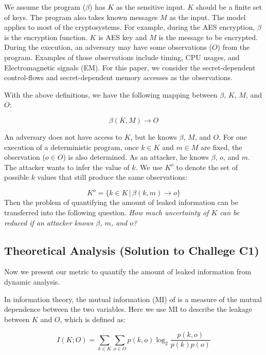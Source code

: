 We assume the program ($\beta$) has $K$ as the sensitive input. $K$ should be a
finite set of keys. The program also takes known messages $M$ as the input. The
model applies to most of the cryptosystems. For example, during the AES
encryption, $\beta$ is the encryption function. $K$ is AES key and $M$ is the
message to be encrypted. During the execution, an adversary may have some
observations ($O$) from the program. Examples of those observations include
timing, CPU usages, and Electromagnetic signals (EM). For this paper, we
consider the secret-dependent control-flows and secret-dependent memory accesses
as the observations.

With the above definitions, we have the following mapping between $\beta$, $K$,
$M$, and $O$:

\begin{displaymath}
    \beta(K, M) \rightarrow O
\end{displaymath}

An adversary does not have access to $K$, but he knows $\beta$, $M$, and $O$.
For one execution of a deterministic program, once $k \in K$ and $m \in M$ are
fixed, the observation ($o \in O$) is also determined. As an attacker, he knows
$\beta$, $o$, and $m$. The attacker wants to infer the value of $k$. We use
$K^o$ to denote the set of possible $k$ values that still produce the same
observations:

\begin{displaymath}
    K^o = \{ k \in K \, |\, \beta(k, m) \rightarrow o\}
\end{displaymath}
Then the problem of quantifying the amount of leaked information can be
transferred into the following question.
\emph{How much uncertainty of $K$ can be reduced if an attacker knows $\beta$, $m$, and $o$?}

\subsection{Theoretical Analysis \textbf{(Solution to Challege C1)}}
Now we present our metric to quantify the amount of leaked information from
dynamic analysis.

In information theory, the mutual information (MI) of is a measure of the mutual
dependence between the two variables. Here we use MI to describe the leakage
between $K$ and $O$, which is defined as:

\begin{equation} \label{eq:1}
    I(K;O) = \sum_{k {\in} K}{\sum_{o {\in} O}{p(k, o)\log_2\frac{p(k, o)}{p(k)p(o)}}}
\end{equation}

